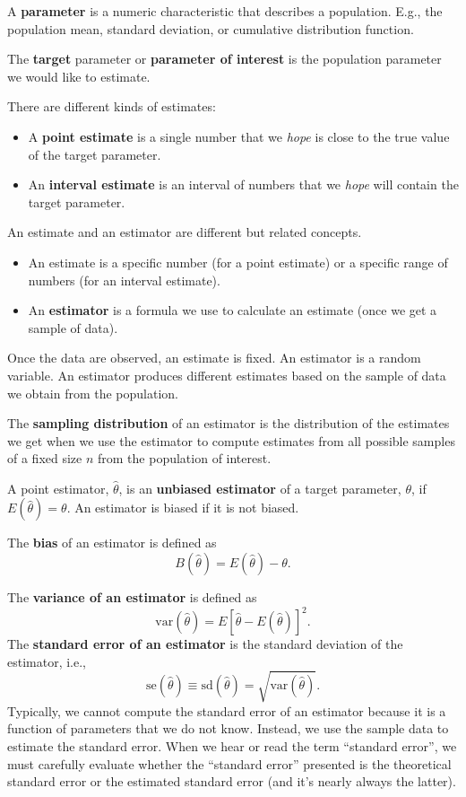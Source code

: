 \documentclass[
]{book}
\providecommand{\tightlist}{%
  \setlength{\itemsep}{0pt}\setlength{\parskip}{0pt}}
\theoremstyle{definition}
\theoremstyle{definition}
\theoremstyle{definition}
\theoremstyle{definition}
\theoremstyle{remark}
\begin{document}
A \textbf{parameter} is a numeric characteristic that describes a population. E.g., the population mean, standard deviation, or cumulative distribution function.

The \textbf{target} parameter or \textbf{parameter of interest} is the population parameter we would like to estimate.

There are different kinds of estimates:

\begin{itemize}
\tightlist
\item
  A \textbf{point estimate} is a single number that we \emph{hope} is close to the true value of the target parameter.
\item
  An \textbf{interval estimate} is an interval of numbers that we \emph{hope} will contain the target parameter.
\end{itemize}

An estimate and an estimator are different but related concepts.

\begin{itemize}
\tightlist
\item
  An estimate is a specific number (for a point estimate) or a specific range of numbers (for an interval estimate).
\item
  An \textbf{estimator} is a formula we use to calculate an estimate (once we get a sample of data).
\end{itemize}

Once the data are observed, an estimate is fixed. An estimator is a random variable. An estimator produces different estimates based on the sample of data we obtain from the population.

The \textbf{sampling distribution} of an estimator is the distribution of the estimates we get when we use the estimator to compute estimates from all possible samples of a fixed size \(n\) from the population of interest.

A point estimator, \(\hat{\theta}\), is an \textbf{unbiased estimator} of a target parameter, \(\theta\), if \(E(\hat{\theta})=\theta\). An estimator is biased if it is not biased.

The \textbf{bias} of an estimator is defined as
\[
B(\hat{\theta})=E(\hat{\theta})-\theta.
\]

The \textbf{variance of an estimator} is defined as
\[
\mathrm{var}(\hat{\theta})=E[\hat{\theta}-E(\hat{\theta})]^2.
\]
The \textbf{standard error of an estimator} is the standard deviation of the estimator, i.e.,
\[
\mathrm{se}(\hat{\theta})\equiv\mathrm{sd}(\hat{\theta})=\sqrt{\mathrm{var}(\hat{\theta})}.
\]
Typically, we cannot compute the standard error of an estimator because it is a function of parameters that we do not know. Instead, we use the sample data to estimate the standard error. When we hear or read the term ``standard error'', we must carefully evaluate whether the ``standard error'' presented is the theoretical standard error or the estimated standard error (and it's nearly always the latter).
\end{document}
